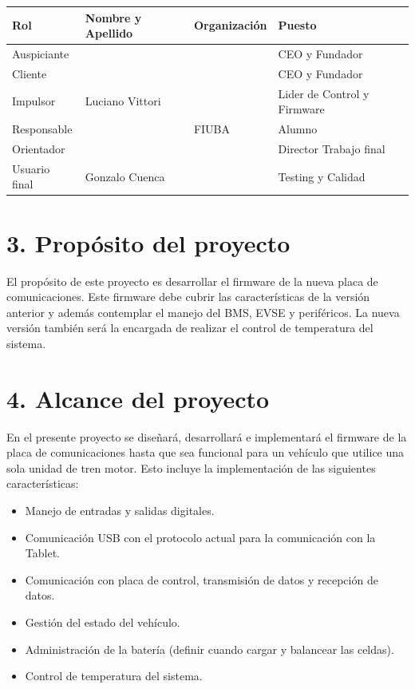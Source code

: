 \documentclass[
11pt, %
codirector, %
]{charter}
\begin{document}
\begin{table}[ht]
	\begin{tabularx}{\linewidth}{@{}|l|X|X|l|@{}}
		\hline
		\rowcolor[HTML]{C0C0C0}
		Rol           & Nombre y Apellido & Organización    & Puesto                      \\ \hline
		Auspiciante   & \clientename      & \empclientename & CEO y Fundador              \\ \hline
		Cliente       & \clientename      & \empclientename & CEO y Fundador              \\ \hline
		Impulsor      & Luciano Vittori   & \empclientename & Lider de Control y Firmware \\ \hline
		Responsable   & \authorname       & FIUBA           & Alumno                      \\ \hline
		Orientador    & \supname          & \pertesupname   & Director Trabajo final      \\ \hline
		Usuario final & Gonzalo Cuenca    & \empclientename & Testing y Calidad           \\ \hline
	\end{tabularx}
\end{table}





\section{3. Propósito del proyecto}
\label{sec:proposito}

El propósito de este proyecto es desarrollar el firmware de la nueva placa de comunicaciones. Este firmware debe cubrir las características de la versión anterior y además contemplar el manejo del BMS, EVSE y periféricos.
La nueva versión también será la encargada de realizar el control de temperatura del sistema.

\section{4. Alcance del proyecto}
\label{sec:alcance}

En el presente proyecto se diseñará, desarrollará e implementará el firmware de la placa de comunicaciones hasta que sea funcional para un vehículo que utilice una sola unidad de tren motor.
Esto incluye la implementación de las siguientes características:
\begin{itemize}
	\item Manejo de entradas y salidas digitales.
	\item Comunicación USB con el protocolo actual para la comunicación con la Tablet.
	\item Comunicación con placa de control, transmisión de datos y recepción de datos.
	\item Gestión del estado del vehículo.
	\item Administración de la batería (definir cuando cargar y balancear las celdas).
	\item Control de temperatura del sistema.
\end{itemize}
\end{document}
